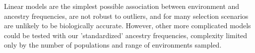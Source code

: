 \documentclass[12pt]{report}
\begin{document}
Linear models are the simplest possible association between environment and ancestry frequencies, are not robust to outliers, and for many selection scenarios are unlikely to be biologically accurate. However, other more complicated models could be tested with our 'standardized' ancestry frequencies, complexity limited only by the number of populations and range of environments sampled.
\end{document}
